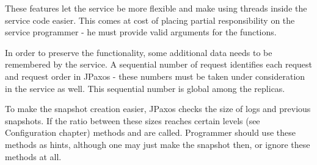 These features let the service be more flexible and make using threads inside the service code easier. This comes at cost of placing partial responsibility on the service programmer - he must provide valid arguments for the functions.

In order to preserve the functionality, some additional data needs to be remembered by the service.
A sequential number of request identifies each request and request order in JPaxos - these numbers must be taken under consideration in the service as well. This sequential number is global among the replicas.

To make the snapshot creation easier, JPaxos checks the size of logs and previous snapshots. If the ratio between these sizes reaches certain levels (see Configuration chapter) methods  and  are called. Programmer should use these methods as hints, although one may just make the snapshot then, or ignore these methods at all.

